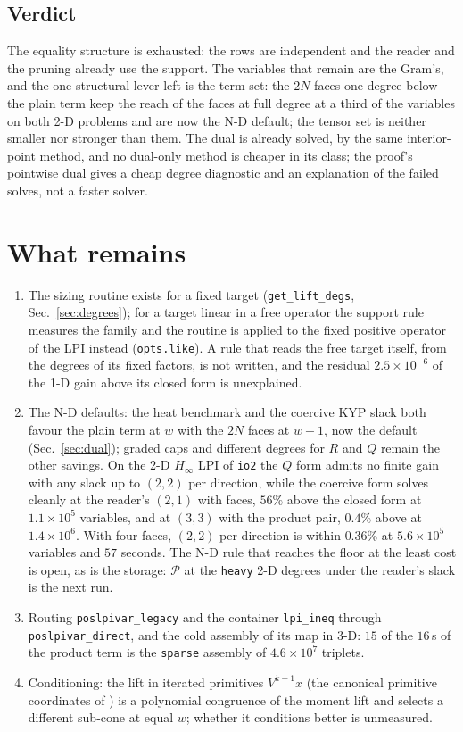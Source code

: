 \documentclass[12pt]{article}
\newcommand{\mcl}[1]{\mathcal{#1}}
\newcommand{\code}[1]{\texttt{#1}}
\newcommand{\file}[1]{\path{#1}}      %
\theoremstyle{plain}
\theoremstyle{definition}
\theoremstyle{remark}
\begin{document}
\subsection{Verdict}

The equality structure is exhausted: the rows are independent and the reader and the pruning already use the support. The variables that remain are the Gram's, and the one structural lever left is the term set: the $2N$ faces one degree below the plain term keep the reach of the faces at full degree at a third of the variables on both 2-D problems and are now the N-D default; the tensor set is neither smaller nor stronger than them. The dual is already solved, by the same interior-point method, and no dual-only method is cheaper in its class; the proof's pointwise dual gives a cheap degree diagnostic and an explanation of the failed solves, not a faster solver.


\section{What remains}\label{sec:remains}

\begin{enumerate}\setlength\itemsep{0pt}
\item The sizing routine exists for a fixed target (\code{get\_lift\_degs}, Sec.~\ref{sec:degrees}); for a target linear in a free operator the support rule measures the family and the routine is applied to the fixed positive operator of the LPI instead (\code{opts.like}). A rule that reads the free target itself, from the degrees of its fixed factors, is not written, and the residual $2.5\times10^{-6}$ of the 1-D gain above its closed form is unexplained.
\item The N-D defaults: the heat benchmark and the coercive KYP slack both favour the plain term at $w$ with the $2N$ faces at $w-1$, now the default (Sec.~\ref{sec:dual}); graded caps and different degrees for $R$ and $Q$ remain the other savings. On the 2-D $H_\infty$ LPI of \code{io2} the $Q$ form admits no finite gain with any slack up to $(2,2)$ per direction, while the coercive form solves cleanly at the reader's $(2,1)$ with faces, $56\%$ above the closed form at $1.1\times10^{5}$ variables, and at $(3,3)$ with the product pair, $0.4\%$ above at $1.4\times10^{6}$. With four faces, $(2,2)$ per direction is within $0.36\%$ at $5.6\times10^{5}$ variables and $57$ seconds. The N-D rule that reaches the floor at the least cost is open, as is the storage: $\mcl P$ at the \code{heavy} 2-D degrees under the reader's slack is the next run.


\item Routing \code{poslpivar\_legacy} and the container \code{lpi\_ineq} through \code{poslpivar\_direct}, and the cold assembly of its map in 3-D: $15$ of the $16$\,s of the product term is the \code{sparse} assembly of $4.6\times10^{7}$ triplets.
\item Conditioning: the lift in iterated primitives $V^{k+1}x$ (the canonical primitive coordinates of \file{primitive_basis_audit.md}) is a polynomial congruence of the moment lift and selects a different sub-cone at equal $w$; whether it conditions better is unmeasured.
\end{enumerate}
\end{document}
